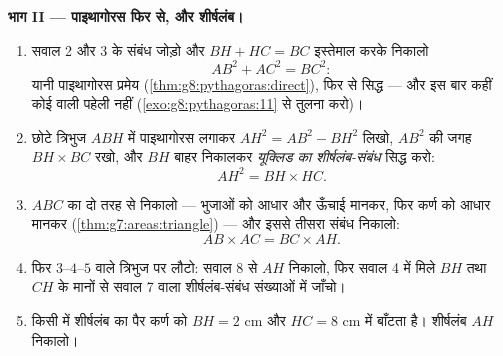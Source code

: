 \begin{problem}[{सप्ताहांत समस्या --- समकोण त्रिभुज का शीर्षलंब:
$AB^2 = BH \times BC$, $AH^2 = BH \times HC$, पाइथागोरस का दूसरा
प्रमाण, और वर्गमूल बनाने वाली एक मशीन}]
\medskip
\noindent\textbf{भाग II --- पाइथागोरस फिर से, और शीर्षलंब।}
\begin{enumerate}[resume]
  \item सवाल 2 और 3 के संबंध जोड़ो और $BH + HC = BC$ इस्तेमाल करके
        निकालो
        \[
        AB^2 + AC^2 = BC^2 :
        \]
        यानी पाइथागोरस प्रमेय (\cref{thm:g8:pythagoras:direct}),
        फिर से सिद्ध --- और इस बार कहीं कोई  वाली पहेली
        नहीं (\cref{exo:g8:pythagoras:11} से तुलना करो)।
  \item छोटे त्रिभुज $ABH$ में पाइथागोरस लगाकर
        $AH^2 = AB^2 - BH^2$ लिखो, $AB^2$ की जगह
        $BH \times BC$ रखो, और $BH$ बाहर निकालकर \emph{यूक्लिड का
        शीर्षलंब-संबंध} सिद्ध करो:
        \[
        AH^2 = BH \times HC .
        \]
  \item $ABC$ का  दो तरह से निकालो ---  भुजाओं को
        आधार और ऊँचाई मानकर, फिर कर्ण को आधार मानकर
        (\cref{thm:g7:areas:triangle}) --- और इससे तीसरा संबंध
        निकालो:
        \[
        AB \times AC = BC \times AH .
        \]
  \item फिर $3$--$4$--$5$ वाले त्रिभुज पर लौटो: सवाल 8 से $AH$
        निकालो, फिर सवाल 4 में मिले $BH$ तथा $CH$ के मानों से सवाल
        7 वाला शीर्षलंब-संबंध संख्याओं में जाँचो।
  \item किसी  में शीर्षलंब का पैर कर्ण को 
        $BH = 2$ cm और $HC = 8$ cm में बाँटता है। शीर्षलंब $AH$
        निकालो।
\end{enumerate}


\end{problem}
